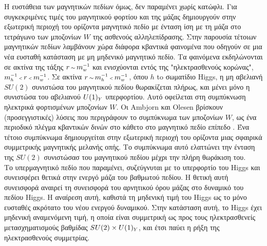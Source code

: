 \par Η ευστάθεια των μαγνητικών πεδίων όμως, δεν παραμένει χωρίς κατώφλι. Για συγκεκριμένες τιμές του μαγνητικού φορτίου και της μάζας δημιουργούν στην εξωτερική περιοχή του ορίζοντα μαγνητικό πεδίο με ένταση ίση με τη μάζα στο τετράγωνο των μποζονίων $W$ της ασθενούς αλληλεπίδρασης. Στην παρουσία τέτοιων μαγνητικών πεδίων λαμβάνουν χώρα διάφορα κβαντικά φαινομένα που οδηγούν σε μια νέα ευσταθή κατάσταση με μη μηδενικό μαγνητικό πεδίο. Τα φαινόμενα εκδηλώνονται σε ακτίνα της τάξης $r\,{\scriptstyle\sim}\,m\subscr{w}\superscr{-1}$ και ενισχύονται εντός της "ηλεκτρασθενούς κορώνας", $m\subscr{h}\superscr{-1}\,{\scriptscriptstyle<}\,r\,{\scriptscriptstyle<}\,m\subscr{w}\superscr{-1}$. Σε ακτίνα $r\,{\scriptstyle\sim}\,m\subscr{h}\superscr{-1}\,{\scriptscriptstyle<}\,m\subscr{w}\superscr{-1}\,$, όπου $h$ to σωματίδιο Higgs, η μη αβελιανή $SU(2)$ συνιστώσα του μαγνητικού πεδίου θωρακίζεται πλήρως, και μένει μόνο η συνιστώσα του αβελιανού $U(1)\subscr{Y}$ υπερφορτίου. 
Αυτό οφείλεται στη συμπύκνωση ηλεκτρικά φορτισμένων μποζονίων $W$. 
Οι Ambjorn και Olesen βρίσκουν (προσεγγιστικές) λύσεις που περιγράφουν το συμπύκνωμα των μποζονίων $W$, ως ένα περιοδικό πλέγμα κβαντικών δινών στο κάθετο στο μαγνητικό πεδίο επίπεδο \cite{AMBJORN1990193}. 
Ένα τέτοιο συμπύκνωμα δημιουργείται στην εξωτερική περιοχή του ορίζοντα μιας σφαιρικά συμμετρικής μαγνητικής μελανής οπής. 
Το συμπύκνωμα αυτό ελαττώνει την ένταση της $SU(2)$ συνιστώσασ του μαγνητικού πεδίου μέχρι την πλήρη θωράκιση του.\\

Το υπερμαγνητικό πεδίο που παραμένει, συζεύγνυται με το υπερφορτίο του Higgs και συνεισφέρει θετικά στην ενεργό μάζα του βαθμωτού πεδίου. Η θετική αυτή συνεισφορά 
αναιρεί τη συνεισφορά του αρνητικού όρου μάζας στο δυναμικό του πεδίου Higgs. Η αναίρεση αυτή, καθιστά τη μηδενική τιμή του Higgs ως το μόνο ευσταθές ακρότατο του νέου ενεργού δυναμικού. Στην κατάσταση αυτή, το Higgs έχει μηδενική αναμενόμενη τιμή, η οποία είναι συμμετρική ως προς τους ηλεκτρασθενείς μετασχηματισμούς βαθμίδας $SU(2)\times U(1)\subscr{Y}$, και έτσι παύει η ρήξη της ηλεκτρασθενούς συμμετρίας.\\

